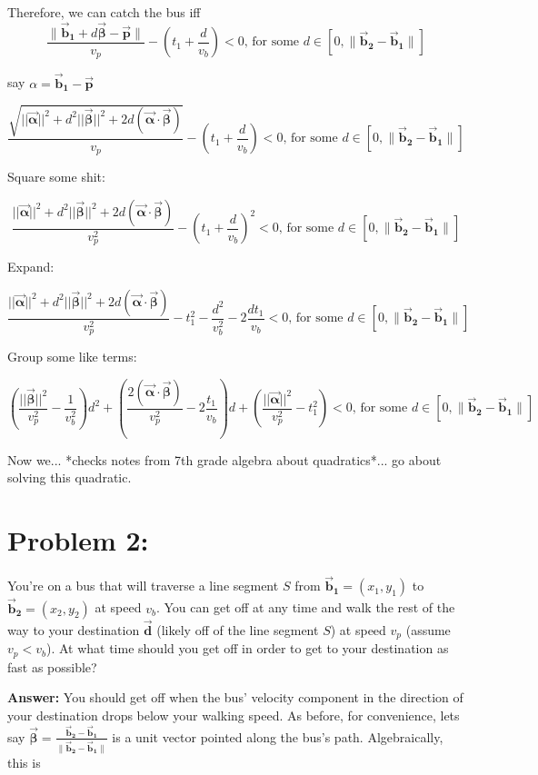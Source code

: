 \documentclass[11pt]{article} %
\begin{document}
Therefore, we can catch the bus iff
$$ \frac{ \| \bm{\vec{b}_1} + d\bm{\vec{\beta}} - \bm{\vec{p}} \|} {v_p} - \left(t_1 + \frac{d}{v_b}\right) < 0 \mbox{, for some } d \in [0,  \|\bm{\vec{b}_2} - \bm{\vec{b}_1}\|] $$

say $\alpha = \bm{\vec{b}_1} - \bm{\vec{p}}$
  
$$ \frac{ \sqrt{ ||\bm{\vec{\alpha}}||^2 + d^2||\bm{\vec{\beta}}||^2 + 2d(\bm{\vec{\alpha}} \cdot \bm{\vec{\beta}}) }} {v_p} - \left(t_1 + \frac{d}{v_b}\right) < 0 \mbox{, for some } d \in [0,  \|\bm{\vec{b}_2} - \bm{\vec{b}_1}\|] $$

Square some shit:

$$ \frac{ ||\bm{\vec{\alpha}}||^2 + d^2||\bm{\vec{\beta}}||^2 + 2d(\bm{\vec{\alpha}} \cdot \bm{\vec{\beta}}) } {v_p^2} - \left(t_1 + \frac{d}{v_b}\right)^2 < 0 \mbox{, for some } d \in [0,  \|\bm{\vec{b}_2} - \bm{\vec{b}_1}\|] $$

Expand:

$$ \frac{ ||\bm{\vec{\alpha}}||^2 + d^2||\bm{\vec{\beta}}||^2 + 2d(\bm{\vec{\alpha}} \cdot \bm{\vec{\beta}}) } {v_p^2} - t_1^2 - \frac{d^2}{v_b^2} - 2 \frac{dt_1}{v_b} < 0 \mbox{, for some } d \in [0,  \|\bm{\vec{b}_2} - \bm{\vec{b}_1}\|] $$

Group some like terms:

$$ \left(\frac{||\bm{\vec{\beta}}||^2}{v_p^2}  - \frac{1}{v_b^2}\right) d^2 + 
\left(\frac{2(\bm{\vec{\alpha}} \cdot \bm{\vec{\beta}}) } {v_p^2} - 2 \frac{t_1}{v_b}\right) d +
\left(\frac{ ||\bm{\vec{\alpha}}||^2}{v_p^2} - t_1^2 \right)
  < 0 \mbox{, for some } d \in [0,  \|\bm{\vec{b}_2} - \bm{\vec{b}_1}\|] $$

Now we... *checks notes from 7th grade algebra about quadratics*... go about solving this quadratic. 

\section*{Problem 2: }
You're on a bus that will traverse a line segment $S$ from $\bm{\vec{b}_1} = (x_1, y_1)$ to  $\bm{\vec{b}_2} = (x_2, y_2)$ at speed $v_b$. You can get off at any time and walk the rest of the way to your destination $\bm{\vec{d}}$ (likely off of the line segment $S$) at speed $v_p$ (assume $v_p < v_b$). At what time should you get off in order to get to your destination as fast as possible?

\vspace{0.5cm} \noindent \textbf{Answer:}
You should get off when the bus' velocity component in the direction of your destination drops below your walking speed. As before, for convenience, lets say $\bm{\vec{\beta}} = \frac{\bm{\vec{b}_2} - \bm{\vec{b}_1}}{\|\bm{\vec{b}_2} - \bm{\vec{b}_1}\|}$ is a unit vector pointed along the bus's path. Algebraically, this is 
\end{document}
